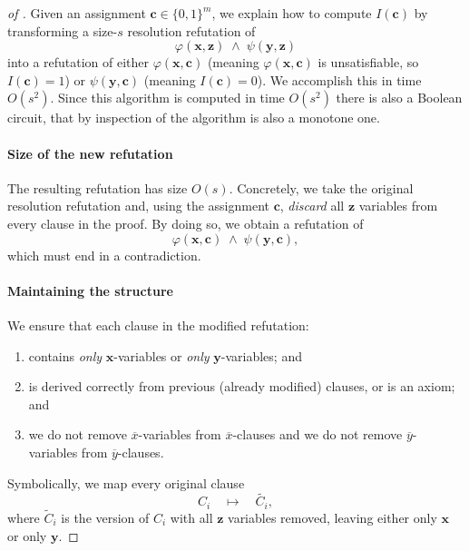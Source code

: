 \bigskip 


\begin{proof}[of ]
Given an assignment \(\mathbf{c} \in \{0,1\}^m\), we explain how to compute \(I(\mathbf{c})\) by transforming a size-\(s\) resolution refutation of
\[
\varphi(\mathbf{x},\mathbf{z}) \;\wedge\; \psi(\mathbf{y},\mathbf{z})
\]
into a refutation of either \(\varphi(\mathbf{x}, \mathbf{c})\) (meaning \(\varphi(\mathbf{x}, \mathbf{c})\) is unsatisfiable, so \(I(\mathbf{c}) = 1\)) or \(\psi(\mathbf{y}, \mathbf{c})\) (meaning \(I(\mathbf{c}) = 0\)). We accomplish this in time \(O(s^2)\).
Since this algorithm is computed in time $O(s^2)$ there is also a Boolean circuit, that by inspection of the algorithm is also a monotone one. 



\paragraph{Size of the new refutation}
The resulting refutation has size \(O(s)\). Concretely, we take the original resolution refutation and, using the assignment \(\mathbf{c}\), \emph{discard} all \(\mathbf{z}\) variables from every clause in the proof. By doing so, we obtain a refutation of
\[
\varphi(\mathbf{x},\mathbf{c}) \;\wedge\; \psi(\mathbf{y},\mathbf{c}),
\]
which must end in a contradiction.

\paragraph{Maintaining the structure}
We ensure that each clause in the modified refutation:
\begin{enumerate}
\item 
  contains \emph{only} \(\mathbf{x}\)-variables or \emph{only} \(\mathbf{y}\)-variables; and 

\item  is derived correctly from previous (already modified) clauses, or is an axiom; and

\item we do not remove $\overline x$-variables 
 from $\overline x$-clauses and  
we do not remove $\overline y$-variables 
 from $\overline y$-clauses.
 
\end{enumerate}

Symbolically, we map every original clause
\[
C_i \quad\longmapsto\quad \widetilde{C_i},
\]
where \(\widetilde C_i\) is the version of \(C_i\) with all \(\mathbf{z}\) variables removed, leaving either only \(\mathbf{x}\) or only \(\mathbf{y}\).


\end{proof}
